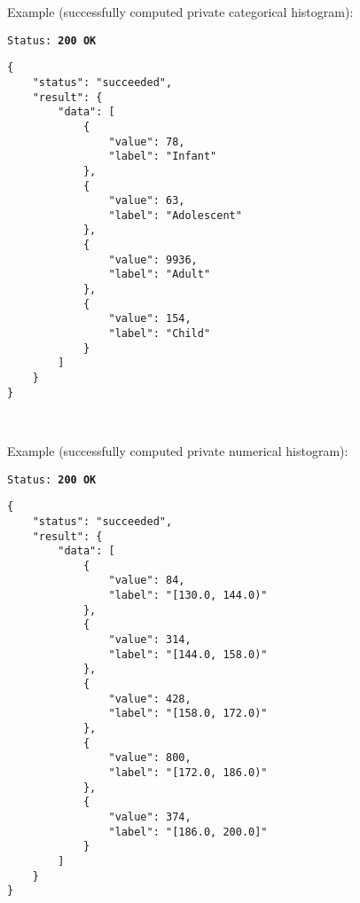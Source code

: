 \begin{description}[labelwidth=5em, leftmargin=\dimexpr\labelwidth+\labelsep\relax]
\begin{minipage}{\linewidth}
  Example (successfully computed private categorical histogram):\\
{
\texttt{Status: {\color{ForestGreen}\textbf{200 OK}}}
\begin{verbatim}
{
    "status": "succeeded",
    "result": {
        "data": [
            {
                "value": 78,
                "label": "Infant"
            },
            {
                "value": 63,
                "label": "Adolescent"
            },
            {
                "value": 9936,
                "label": "Adult"
            },
            {
                "value": 154,
                "label": "Child"
            }
        ]
    }
}
\end{verbatim}
\label{sc:get-response-sucessful-1}
}
\end{minipage}
\ \\
\begin{minipage}{\linewidth}
  Example (successfully computed private numerical histogram):\\
{
\texttt{Status: {\color{ForestGreen}\textbf{200 OK}}}
\begin{verbatim}
{
    "status": "succeeded",
    "result": {
        "data": [
            {
                "value": 84,
                "label": "[130.0, 144.0)"
            },
            {
                "value": 314,
                "label": "[144.0, 158.0)"
            },
            {
                "value": 428,
                "label": "[158.0, 172.0)"
            },
            {
                "value": 800,
                "label": "[172.0, 186.0)"
            },
            {
                "value": 374,
                "label": "[186.0, 200.0]"
            }
        ]
    }
}
\end{verbatim}
\label{sc:get-response-sucessful-2}
}
\end{minipage}


\end{description}
